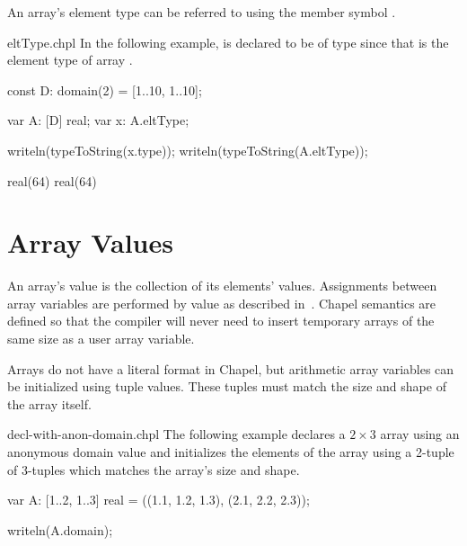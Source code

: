%
%
An array's element type can be referred to using the member symbol
.

\begin{chapelexample}{eltType.chpl}
In the following example,  is declared to be of type
 since that is the element type of array .
\begin{chapelpre}
const D: domain(2) = [1..10, 1..10];
\end{chapelpre}
\begin{chapel}
var A: [D] real;
var x: A.eltType;
\end{chapel}
\begin{chapelpost}
writeln(typeToString(x.type));
writeln(typeToString(A.eltType));
\end{chapelpost}
\begin{chapeloutput}
real(64)
real(64)
\end{chapeloutput}
\end{chapelexample}

\section{Array Values}
\label{Array_Values}

An array's value is the collection of its elements' values.
Assignments between array variables are performed by value as
described in~.  Chapel semantics are defined so
that the compiler will never need to insert temporary arrays of the
same size as a user array variable.

Arrays do not have a literal format in Chapel, but arithmetic array
variables can be initialized using tuple values.  These tuples must
match the size and shape of the array itself.

\begin{chapelexample}{decl-with-anon-domain.chpl}
The following example declares a $2 \times 3$ array  using an
anonymous domain value and initializes the elements of the array using
a 2-tuple of 3-tuples which matches the array's size and shape.
\begin{chapel}
var A: [1..2, 1..3] real = ((1.1, 1.2, 1.3), (2.1, 2.2, 2.3));
\end{chapel}
\begin{chapelpost}
writeln(A.domain);
\end{chapelpost}
\begin{chapeloutput}
[1..2, 1..3]
\end{chapeloutput}
\end{chapelexample}

